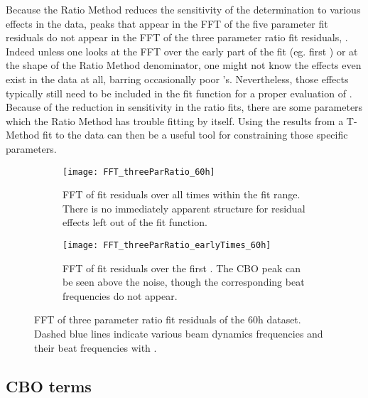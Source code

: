 Because the Ratio Method reduces the sensitivity of the \wa determination to various effects in the data, peaks that appear in the FFT of the five parameter fit residuals do not appear in the FFT of the three parameter ratio fit residuals, . Indeed unless one looks at the FFT over the early part of the fit (eg. first ) or at the shape of the Ratio Method denominator, one might not know the effects even exist in the data at all, barring occasionally poor \chisq's. Nevertheless, those effects typically still need to be included in the fit function for a proper evaluation of \wa. Because of the reduction in sensitivity in the ratio fits, there are some parameters which the Ratio Method has trouble fitting by itself. Using the results from a T-Method fit to the data can then be a useful tool for constraining those specific parameters.


\begin{figure}
\centering
    \begin{subfigure}[t]{0.67\textwidth}
        \centering
        \texttt{[image: FFT\_threeParRatio\_60h]}
        \caption{FFT of fit residuals over all times within the fit range. There is no immediately apparent structure for residual effects left out of the fit function.}
    \end{subfigure}%

    \begin{subfigure}[t]{0.67\textwidth}
        \centering
        \texttt{[image: FFT\_threeParRatio\_earlyTimes\_60h]}
        \caption{FFT of fit residuals over the first . The CBO peak can be seen above the noise, though the corresponding beat frequencies do not appear.}
    \end{subfigure}
\caption[FFT of three parameter ratio fit residuals]{FFT of three parameter ratio fit residuals of the 60h dataset. Dashed blue lines indicate various beam dynamics frequencies and their beat frequencies with \wa.}
\label{fig:fft_threeParamRatio}
\end{figure}




\subsection{CBO terms}
\label{sub:cboterms}


